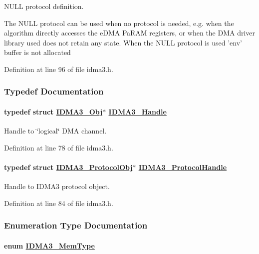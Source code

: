 NULL protocol definition. 

The NULL protocol can be used when no protocol is needed, e.g. when the algorithm directly accesses the e\-DMA Pa\-RAM registers, or when the DMA driver library used does not retain any state. When the NULL protocol is used 'env' buffer is not allocated 

Definition at line 96 of file idma3.h.

\subsubsection{Typedef Documentation}
\hypertarget{group___d_s_p_i_d_m_a3_g8960c528f0708a559bcaab34a865e1a5}{
\paragraph[IDMA3\_\-Handle]{\setlength{\rightskip}{0pt plus 5cm}typedef struct \hyperlink{struct_i_d_m_a3___obj}{IDMA3\_\-Obj}$\ast$ \hyperlink{struct_i_d_m_a3___obj}{IDMA3\_\-Handle}}\hfill}
\label{group___d_s_p_i_d_m_a3_g8960c528f0708a559bcaab34a865e1a5}


Handle to \char`\"{}logical\char`\"{} DMA channel. 



Definition at line 78 of file idma3.h.\hypertarget{group___d_s_p_i_d_m_a3_gdd329735609d8384c3625554c0f2c58d}{
\paragraph[IDMA3\_\-ProtocolHandle]{\setlength{\rightskip}{0pt plus 5cm}typedef struct \hyperlink{struct_i_d_m_a3___protocol_obj}{IDMA3\_\-Protocol\-Obj}$\ast$ \hyperlink{struct_i_d_m_a3___protocol_obj}{IDMA3\_\-Protocol\-Handle}}\hfill}
\label{group___d_s_p_i_d_m_a3_gdd329735609d8384c3625554c0f2c58d}


Handle to IDMA3 protocol object. 



Definition at line 84 of file idma3.h.

\subsubsection{Enumeration Type Documentation}
\hypertarget{group___d_s_p_i_d_m_a3_gbe0577eecc288b36121382daa765093a}{
\paragraph[IDMA3\_\-MemType]{\setlength{\rightskip}{0pt plus 5cm}enum \hyperlink{group___d_s_p_i_d_m_a3_gbe0577eecc288b36121382daa765093a}{IDMA3\_\-Mem\-Type}}\hfill}
\label{group___d_s_p_i_d_m_a3_gbe0577eecc288b36121382daa765093a}


